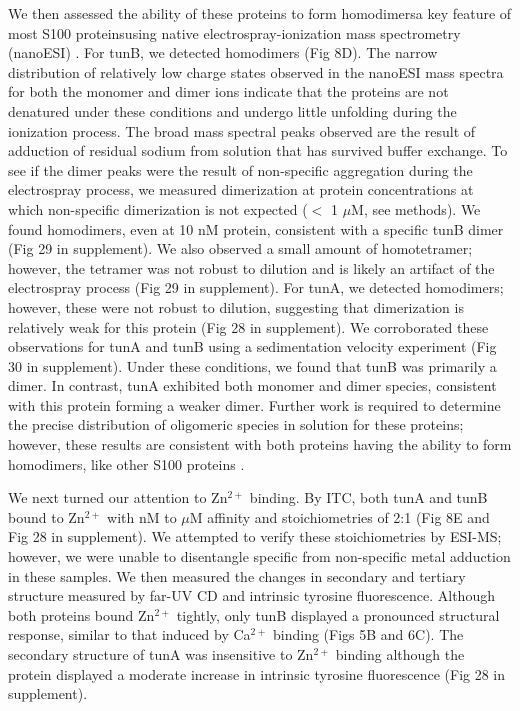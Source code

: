 We then assessed the ability of these proteins to form homodimers\textemdash a
key feature of most S100 proteins\textemdash using native electrospray-ionization
mass spectrometry (nanoESI) \cite{hernandez_determining_2007}. For
tunB, we detected homodimers (Fig 8D). The narrow distribution of
relatively low charge states observed in the nanoESI mass spectra
for both the monomer and dimer ions indicate that the proteins are
not denatured under these conditions and undergo little unfolding
during the ionization process. The broad mass spectral peaks observed
are the result of adduction of residual sodium from solution that
has survived buffer exchange. To see if the dimer peaks were the result
of non-specific aggregation during the electrospray process, we measured
dimerization at protein concentrations at which non-specific dimerization
is not expected ($<$ 1 $\mu$M, see methods). We found homodimers,
even at 10 nM protein, consistent with a specific tunB dimer (Fig 29 in supplement).
We also observed a small amount of homotetramer; however, the tetramer
was not robust to dilution and is likely an artifact of the electrospray
process (Fig 29 in supplement). For tunA, we detected homodimers; however, these
were not robust to dilution, suggesting that dimerization is relatively
weak for this protein (Fig 28 in supplement). We corroborated these observations
for tunA and tunB using a sedimentation velocity experiment (Fig 30 in supplement).
Under these conditions, we found that tunB was primarily a dimer.
In contrast, tunA exhibited both monomer and dimer species, consistent
with this protein forming a weaker dimer. Further work is required
to determine the precise distribution of oligomeric species in solution
for these proteins; however, these results are consistent with both
proteins having the ability to form homodimers, like other S100 proteins
\cite{streicher_modulation_2010}.

We next turned our attention to Zn$^{2+}$ binding. By ITC, both tunA
and tunB bound to Zn$^{2+}$ with nM to $\mu$M affinity and stoichiometries
of 2:1 (Fig 8E and Fig 28 in supplement). We attempted to verify these stoichiometries
by ESI-MS; however, we were unable to disentangle specific from non-specific
metal adduction in these samples. We then measured the changes in
secondary and tertiary structure measured by far-UV CD and intrinsic
tyrosine fluorescence. Although both proteins bound Zn$^{2+}$ tightly,
only tunB displayed a pronounced structural response, similar to that
induced by Ca$^{2+}$ binding (Figs 5B and 6C). The secondary structure
of tunA was insensitive to Zn$^{2+}$ binding although the protein
displayed a moderate increase in intrinsic tyrosine fluorescence (Fig 28 in supplement).

